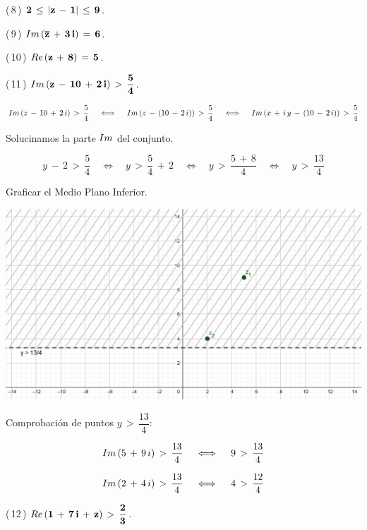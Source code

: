 \documentclass[a4paper,11pt,openany]{book}
\begin{document}
\textcolor{ao(english)}{(\,8\,)} $\bf{2\,\leq\,|z\,-\,1|\,\leq\,9}$.

\textcolor{ao(english)}{(\,9\,)} $\bf{\mathnormal{Im}\,(\overline{z}\,+\,3\,i)\,=\,6}$.

\textcolor{ao(english)}{(\,10\,)} $\bf{\mathnormal{Re}\,(z\,+\,8)\,=\,5}$.

\textcolor{ao(english)}{(\,11\,)} $\bf{\mathnormal{Im}\,(z\,-\,10\,+\,2\,i)\,>\,\dfrac{5}{4}}$.

$$\mathnormal{Im}\,(z\,-\,10\,+\,2\,i)\,>\,\dfrac{5}{4} \quad\iff\quad \mathnormal{Im}\,(z\,-\,(10\,-\,2\,i))\,>\,\dfrac{5}{4} \quad\iff\quad \mathnormal{Im}\,(x\,+\,i\,y\,-\,(10\,-\,2\,i))\,>\,\dfrac{5}{4}$$

\textcolor{ao(english)}{} Solucinamos la parte $\mathnormal{Im}$ del conjunto.

$$y\,-\,2\,>\,\dfrac{5}{4} \quad\iff\quad y\,>\,\dfrac{5}{4}\,+\,2 \quad\iff\quad y\,>\,\dfrac{5\,+\,8}{4} \quad\iff\quad y\,>\,\dfrac{13}{4}$$

\textcolor{ao(english)}{} Graficar el Medio Plano Inferior.

\begin{center}
    \includegraphics[width=15cm]{Gra-Ej-11.png}
\end{center}

\textcolor{ao(english)}{} Comprobación de puntos $y\,>\,\dfrac{13}{4}$:

$$\mathnormal{Im}\,(5\,+\,9\,i)\,>\,\dfrac{13}{4} \quad\iff\quad 9\,>\,\dfrac{13}{4}$$

$$\mathnormal{Im}\,(2\,+\,4\,i)\,>\,\dfrac{13}{4} \quad\iff\quad 4\,>\,\dfrac{12}{4}$$

\textcolor{ao(english)}{(\,12\,)} $\bf{\mathnormal{Re}\,(1\,+\,7\,i\,+\,z)\,>\,\dfrac{2}{3}}$.
\end{document}
